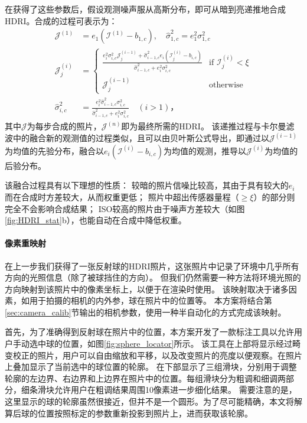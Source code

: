 在获得了这些参数后，假设观测噪声服从高斯分布，即可从暗到亮递推地合成HDRI。合成的过程可表示为：
\begin{equation}
\begin{aligned}
    \mathcal{J}^{(1)} &= e_1 \left(\mathcal{I}^{(1)} - b_{1,c}\right),\quad
    \hat{\sigma}_{1,c}^2 = e_1^2 \sigma_{1,c}^2 \\
    \mathcal{J}^{(i)}_j &= \begin{cases}
    \frac{e_i^2 \sigma_{i,c}^2 \mathcal{J}^{(i-1)}_j + \hat{\sigma}_{i-1,c}^2 e_i \left(\mathcal{I}^{(i)}_j - b_{i,c}\right)}{\hat{\sigma}_{i-1,c}^2 + e_i^2 \sigma_{i,c}^2} & \text{if } \mathcal{I}^{(i)}_j < \xi \\
    \mathcal{J}^{(i-1)}_j & \text{otherwise}
    \end{cases}\\
    \hat{\sigma}_{i,c}^2 &= \frac{e_i^2 \hat{\sigma}_{i-1,c}^2 \sigma_{i,c}^2}{\hat{\sigma}_{i-1,c}^2 + e_i^2 \sigma_{i,c}^2}
    \quad (i > 1)\text{，}
\end{aligned}
\end{equation}
其中$\mathcal{J}$为每步合成的照片，$\mathcal{J}^{(n)}$即为最终所需的HDRI。
该递推过程与卡尔曼滤波中的融合新的观测值的过程类似，且可以由贝叶斯公式导出，即通过以$\mathcal{J}^{(i-1)}$为均值的先验分布，融合以$e_i\left(\mathcal{I}^{(i)} - b_{i,c}\right)$为均值的观测，推导以$\mathcal{J}^{(i)}$为均值的后验分布。

该融合过程具有以下理想的性质：
较暗的照片信噪比较高，其由于具有较大的$e_i$而在合成时方差较大，从而权重更低；
照片中超出传感器量程（$\geq\xi$）的部分则完全不会影响合成结果；
ISO较高的照片由于噪声方差较大（如图\ref{fig:HDRI_stat}b），也能自动在合成中降低权重。

\paragraph{像素重映射}
在上一步我们获得了一张反射球的HDRI照片，这张照片中记录了环境中几乎所有方向的光照信息（除了被球挡住的方向）。
但我们仍然需要一种方法将环境光照的方向映射到该照片中的像素坐标上，以便于在渲染时使用。
该映射取决于诸多因素，如用于拍摄的相机的内外参，球在照片中的位置等。
本方案将结合第\ref{sec:camera_calib}节输出的相机参数，使用一种半自动化的方式完成该映射。

首先，为了准确得到反射球在照片中的位置，本方案开发了一款标注工具以允许用户手动选中球的位置，如图\ref{fig:sphere_locator}所示。
该工具在上部将显示经过畸变校正的照片，用户可以自由缩放和平移，以及改变照片的亮度以便观察。在照片上叠加显示了当前选中的球位置的轮廓。
在下部显示了三组滑块，分别用于调整轮廓的左边界、右边界和上边界在照片中的位置。每组滑块分为粗调和细调两部分，细条滑块允许用户在粗调结果周围10像素进一步细化结果。
需要注意的是，这里显示的球的轮廓虽然很接近，但并不是一个圆形。为了尽可能精确，本文将解算后球的位置按照标定的参数重新投影到照片上，进而获取该轮廓。

